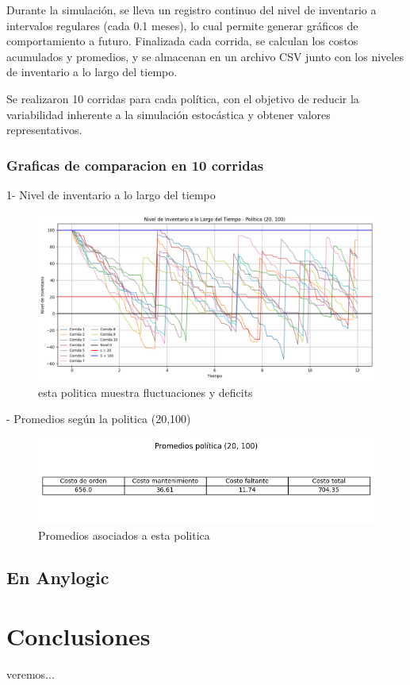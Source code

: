 \documentclass{article}
\begin{document}
Durante la simulación, se lleva un registro continuo del nivel de inventario a intervalos regulares (cada 0.1 meses), lo cual permite generar gráficos de comportamiento a futuro. Finalizada cada corrida, se calculan los costos acumulados y promedios, y se almacenan en un archivo CSV junto con los niveles de inventario a lo largo del tiempo.

Se realizaron 10 corridas para cada política, con el objetivo de reducir la variabilidad inherente a la simulación estocástica y obtener valores representativos.

\subsubsection{Graficas de comparacion en 10 corridas}
1- Nivel de inventario a lo largo del tiempo
\begin{figure}
    \centering
    \includegraphics[width=0.5\linewidth]{Imagenes/Inventario/inventario_vs_tiempo_20_100.png}
    \caption{esta politica muestra fluctuaciones y deficits}
    \label{fig:enter-label}
\end{figure}
- Promedios según la politica (20,100)
\begin{figure}
    \centering
    \includegraphics[width=0.5\linewidth]{Imagenes/Inventario/promedios_20_100.png}
    \caption{Promedios asociados a esta politica}
    \label{fig:enter-label}
\end{figure}
\FloatBarrier

\subsection{En Anylogic}


\section{Conclusiones}

veremos...
\end{document}
